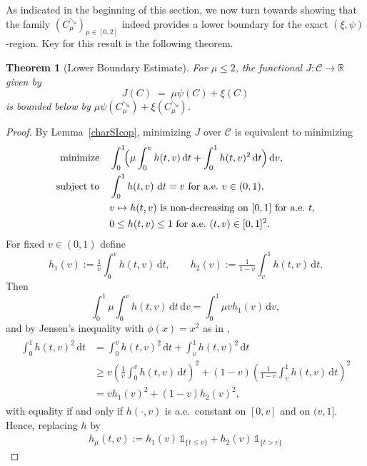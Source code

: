 \documentclass{article}
\newtheorem{theorem}{Theorem}[section]
\newcommand{\1}{\mathds{1}}
\newcommand{\de}{\mathrm{\,d}}
\newcommand{\CC}{\mathcal{C}}  %
\newcommand{\R}{\mathbb{R}}
\begin{document}
As indicated in the beginning of this section, we now turn towards showing that the family $(C^{\searrow}_\mu)_{\mu\in[0,2]}$ indeed provides a lower boundary for the exact $(\xi,\psi)$-region.
Key for this result is the following theorem.

\begin{theorem}[Lower Boundary Estimate]\label{thm:lower_boundary_mu_half}
For $\mu \le 2$, the functional $J:\CC \to \R$ given by
\[
    J(C) \;=\; \mu \psi(C) + \xi(C)
\]
is bounded below by $\mu \psi(C^{\searrow}_\mu) + \xi(C^{\searrow}_\mu)$.
\end{theorem}

\begin{proof}
By Lemma~\ref{charSIcop}, minimizing $J$ over $\CC$ is equivalent to minimizing 
\begin{align}\begin{aligned} \label{eq:jensen-h}
    \text{minimize} \quad & \int_0^1\!\Bigl(\mu \int_0^v h(t,v)\de t + \int_0^1 h(t,v)^2 \de t\Bigr)\de v,\\
    \text{subject to} \quad
    & \int_0^1 h(t,v)\, \de t = v \text{ for a.e.~} v\in(0,1), \\
    & v \mapsto h(t,v)\ \text{is non-decreasing on }[0,1]\ \text{for a.e.~}t, \\
    & 0\le h(t,v) \le 1 \text{ for a.e.~}(t,v)\in[0,1]^2.
\end{aligned}\end{align}
For fixed $v\in(0,1)$ define
\[
h_1(v):=\tfrac1v\int_0^v h(t,v)\de t, 
\qquad
h_2(v):=\tfrac1{1-v}\int_v^1 h(t,v)\de t .
\]
Then
\[
\int_0^1 \mu \int_0^v h(t,v)\de t\de v = \int_0^1 \mu v h_1(v)\de v,
\]
and by Jensen’s inequality with $\phi(x)=x^2$ as in \cite[Frm.~(2.8)]{pecaric1992convex},
\begin{align}
    \label{eq:jensen}
    \begin{aligned}
    \int_0^1 h(t,v)^2 \de t &= \int_0^v h(t,v)^2 \de t + \int_v^1 h(t,v)^2 \de t \\
    &\ge v \left( \frac{1}{v} \int_0^v h(t,v) \de t \right)^2 + (1-v) \left( \frac{1}{1-v} \int_v^1 h(t,v) \de t \right)^2 \\
    &= v h_1(v)^2 + (1-v) h_2(v)^2,
    \end{aligned}
\end{align}
with equality if and only if $h(\cdot,v)$ is a.e.\ constant on $[0,v]$ and on $(v,1]$.
Hence, replacing $h$ by
\begin{align}\label{eq:lower_bound_replacement}
h_{\mu}(t,v):= h_1(v)\,\1_{\{t\le v\}} + h_2(v)\,\1_{\{t>v\}}

\end{align}
\end{proof}
\end{document}
